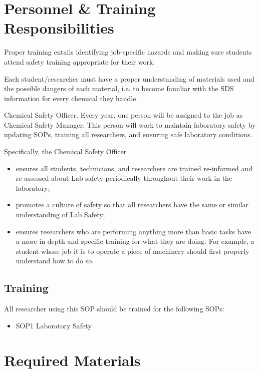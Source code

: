 \documentclass[12pt]{../SOP3}\usepackage[]{graphicx}\usepackage[]{color}
\begin{document}
\section{Personnel \& Training Responsibilities}

\NP Proper training entails identifying job-specific hazards and making sure students attend safety training appropriate for their work. 

\NP Each student/researcher must have a proper understanding of materials used and the possible dangers of each material, i.e. to become familiar with the SDS information for every chemical they handle.

\NP Chemical Safety Officer. Every year, one person will be assigned to the job as Chemical Safety Manager. This person will work to maintain laboratory safety by updating SOPs, training all researchers, and ensuring safe laboratory conditions.

\NP Specifically, the Chemical Safety Officer 

\begin{itemize}
  \item ensures all students, technicians, and researchers are trained re-informed and re-assessed about Lab safety periodically throughout their work in the laboratory;
  \item promotes a culture of safety so that all researchers have the same or similar understanding of Lab Safety;
  \item ensures researchers who are performing anything more than basic tasks have a more in depth and specific training for what they are doing. For example, a student whose job it is to operate a piece of machinery should first properly understand how to do so.

\end{itemize}

\subsection*{Training}

\NP All researcher using this SOP should be trained for the following SOPs:

\begin{itemize}
  \item SOP1 Laboratory Safety
\end{itemize}

\section{Required Materials}
\end{document}
